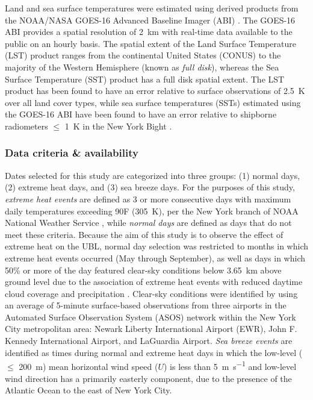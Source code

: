 \documentclass[num-refs]{wiley-article}
\begin{document}
Land and sea surface temperatures were estimated using derived products from the NOAA/NASA GOES-16 Advanced Baseline Imager (ABI) \citep{ignatov2010, yu2008}. The GOES-16 ABI provides a spatial resolution of \SI{2}{\kilo\meter} with real-time data available to the public on an hourly basis. The spatial extent of the Land Surface Temperature (LST) product ranges from the continental United States (CONUS) to the majority of the Western Hemisphere (known as \textit{full disk}), whereas the Sea Surface Temperature (SST) product has a full disk spatial extent. The LST product has been found to have an error relative to surface observations of \SI{2.5}{K} over all land cover types, while sea surface temperatures (SSTs) estimated using the GOES-16 ABI have been found to have an error relative to shipborne radiometers $\leq$ \SI{1}{\kelvin} in the New York Bight \citep{luo2021}.

\subsubsection{Data criteria \& availability}
Dates selected for this study are categorized into three groups: (1) normal days, (2) extreme heat days, and (3) sea breeze days. For the purposes of this study, \textit{extreme heat events} are defined as 3 or more consecutive days with maximum daily temperatures exceeding 90\textdegree F (\SI{305}{\kelvin}), per the New York branch of NOAA National Weather Service \citep{robinson2001, nws2018}, while \textit{normal days} are defined as days that do not meet these criteria. Because the aim of this study is to observe the effect of extreme heat on the UBL, normal day selection was restricted to months in which extreme heat events occurred (May through September), as well as days in which 50\% or more of the day featured clear-sky conditions below \SI{3.65}{\kilo\meter} above ground level due to the association of extreme heat events with reduced daytime cloud coverage and precipitation \citep{stefanon2014, thomas2020}. Clear-sky conditions were identified by using an average of 5-minute surface-based observations from three airports in the Automated Surface Observation System (ASOS) \citep{asos1998} network within the New York City metropolitan area: Newark Liberty International Airport (EWR), John F. Kennedy International Airport, and LaGuardia Airport. \textit{Sea breeze events} are identified as times during normal and extreme heat days in which the low-level ($\leq$ \SI{200}{\meter}) mean horizontal wind speed ($U$) is less than \SI{5}{\meter\per\second} and low-level wind direction has a primarily easterly component, due to the presence of the Atlantic Ocean to the east of New York City.
\end{document}
